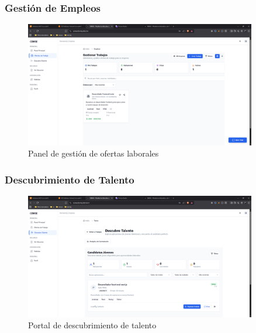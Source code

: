 \documentclass[12pt,a4paper]{article}
\begin{document}
\begin{enumerate}
\subsubsection{Gestión de Empleos}
\begin{figure}[H]
    \centering
    \includegraphics[width=0.9\textwidth]{screenshots/companies/job-management.png}
    \caption{Panel de gestión de ofertas laborales}
    \label{fig:company-jobs}
\end{figure}

\subsubsection{Descubrimiento de Talento}
\begin{figure}[H]
    \centering
    \includegraphics[width=0.9\textwidth]{screenshots/companies/talent-discovery.png}
    \caption{Portal de descubrimiento de talento}
    \label{fig:company-talent}
\end{figure}


\end{enumerate}
\end{document}
